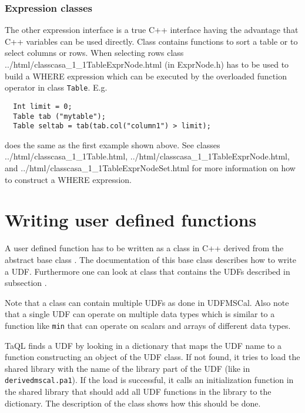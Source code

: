 \subsubsection{Expression classes}
    The other expression interface is a true C++ interface having the
    advantage that C++ variables can be used directly. Class
    contains functions to sort a table or to select columns or rows.
    When selecting rows class 
    {../html/classcasa_1_1TableExprNode.html} (in ExprNode.h)
    has to be used to
    build a WHERE expression which can be executed by the overloaded
    function operator in class \texttt{Table}. E.g.
\begin{verbatim}
  Int limit = 0;
  Table tab ("mytable");
  Table seltab = tab(tab.col("column1") > limit);
\end{verbatim}
    does the same as the first example shown above.
    See classes 
    {../html/classcasa_1_1Table.html},
    {../html/classcasa_1_1TableExprNode.html}, and
    {../html/classcasa_1_1TableExprNodeSet.html} for more
    information on how to construct a WHERE expression.

\section{\label{TAQL:UDFWRITE}Writing user defined functions}
A user defined function has to be written as a class in C++
derived from the abstract base class
.
The documentation of this base class describes how to write a
UDF. Furthermore one can look at class
that contains the UDFs described in subsection
.

Note that a class can contain multiple UDFs as done in UDFMSCal.
Also note that a single UDF can operate on multiple data types which
is similar to a function like \texttt{min} that can operate on scalars
and arrays of different data types.

TaQL finds a UDF by looking in a dictionary that maps the UDF name
to a function constructing an  object of the UDF class. If not found,
it tries to load the shared library with the name of the library part
of the UDF (like in \texttt{derivedmscal.pa1}). If the load is successful, it calls an
initialization function in the shared library that should add all UDF
functions in the library to the dictionary. The description of the
class shows how this should be done.

